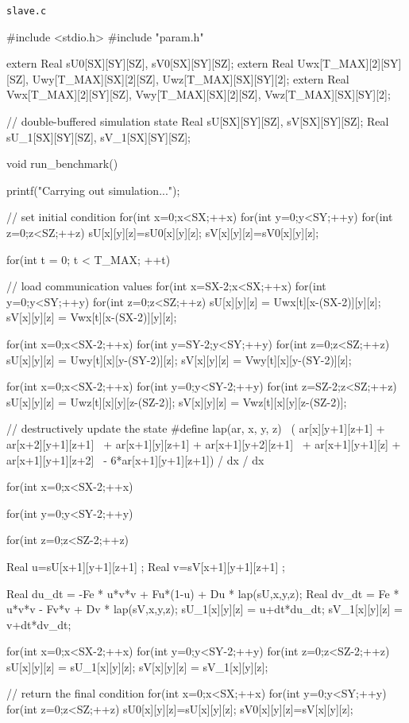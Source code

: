 \verb`slave.c`
\begin{code}
#include <stdio.h>
#include "param.h"

extern Real sU0[SX][SY][SZ], sV0[SX][SY][SZ];
extern Real Uwx[T_MAX][2][SY][SZ], Uwy[T_MAX][SX][2][SZ], Uwz[T_MAX][SX][SY][2];
extern Real Vwx[T_MAX][2][SY][SZ], Vwy[T_MAX][SX][2][SZ], Vwz[T_MAX][SX][SY][2];


// double-buffered simulation state
Real sU[SX][SY][SZ], sV[SX][SY][SZ];
Real sU_1[SX][SY][SZ], sV_1[SX][SY][SZ];


void run_benchmark(){

  printf("Carrying out simulation...\n");

  // set initial condition
  for(int x=0;x<SX;++x) {
    for(int y=0;y<SY;++y) {
      for(int z=0;z<SZ;++z) {
        sU[x][y][z]=sU0[x][y][z];
        sV[x][y][z]=sV0[x][y][z];
      }
    }
  }

  for(int t = 0; t < T_MAX; ++t){
    // load communication values
    for(int x=SX-2;x<SX;++x) {
      for(int y=0;y<SY;++y) {
        for(int z=0;z<SZ;++z) {
          sU[x][y][z] = Uwx[t][x-(SX-2)][y][z];
          sV[x][y][z] = Vwx[t][x-(SX-2)][y][z];
        }
      }
    }

    for(int x=0;x<SX-2;++x) {
      for(int y=SY-2;y<SY;++y) {
        for(int z=0;z<SZ;++z) {
          sU[x][y][z] = Uwy[t][x][y-(SY-2)][z];
          sV[x][y][z] = Vwy[t][x][y-(SY-2)][z];
        }
      }
    }

    for(int x=0;x<SX-2;++x) {
      for(int y=0;y<SY-2;++y) {
        for(int z=SZ-2;z<SZ;++z) {
          sU[x][y][z] = Uwz[t][x][y][z-(SZ-2)];
          sV[x][y][z] = Vwz[t][x][y][z-(SZ-2)];
        }
      }
    }



    // destructively update the state
#define lap(ar, x, y, z)                        \
    ( ar[x][y+1][z+1] + ar[x+2][y+1][z+1]       \
      + ar[x+1][y][z+1] + ar[x+1][y+2][z+1]     \
      + ar[x+1][y+1][z] + ar[x+1][y+1][z+2]     \
        - 6*ar[x+1][y+1][z+1]) / dx / dx

    for(int x=0;x<SX-2;++x) {
      for(int y=0;y<SY-2;++y) {
        for(int z=0;z<SZ-2;++z) {
          Real u=sU[x+1][y+1][z+1] ;
          Real v=sV[x+1][y+1][z+1] ;

          Real du_dt = -Fe * u*v*v + Fu*(1-u) + Du * lap(sU,x,y,z);
          Real dv_dt =  Fe * u*v*v - Fv*v     + Dv * lap(sV,x,y,z);
          sU_1[x][y][z] = u+dt*du_dt;
          sV_1[x][y][z] = v+dt*dv_dt;
        }
      }
    }


    for(int x=0;x<SX-2;++x) {
      for(int y=0;y<SY-2;++y) {
        for(int z=0;z<SZ-2;++z) {
          sU[x][y][z] = sU_1[x][y][z];
          sV[x][y][z] = sV_1[x][y][z];
        }
      }
    }
  }

  // return the final condition
  for(int x=0;x<SX;++x) {
    for(int y=0;y<SY;++y) {
      for(int z=0;z<SZ;++z) {
        sU0[x][y][z]=sU[x][y][z];
        sV0[x][y][z]=sV[x][y][z];
      }
    }
  }

}

\end{code}

